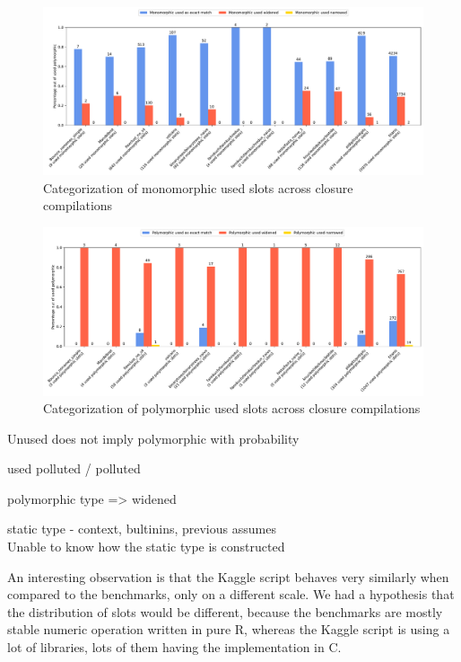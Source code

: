 \begin{figure}
	\centering
	\begin{adjustwidth}{-3cm}{-3cm}
		\includegraphics[width=1.5\textwidth]{figures/used_mono.pdf}
	\end{adjustwidth}
	\caption{Categorization of monomorphic used slots across closure compilations}\label{fig:graph-used-mono}
\end{figure}

\begin{figure}
	\centering
	\begin{adjustwidth}{-3cm}{-3cm}
		\includegraphics[width=1.5\textwidth]{figures/used_poly.pdf}
	\end{adjustwidth}
	\caption{Categorization of polymorphic used slots across closure compilations}\label{fig:graph-used-poly}
\end{figure}

Unused does not imply polymorphic with probability

used polluted / polluted

polymorphic type => widened

static type - context, bultinins, previous assumes \\
Unable to know how the static type is constructed

An interesting observation is that the Kaggle script behaves very similarly when compared to the benchmarks, only on a different scale. We had a hypothesis that the distribution of slots would be different, because the benchmarks are mostly stable numeric operation written in pure R, whereas the Kaggle script is using a lot of libraries, lots of them having the implementation in C.

